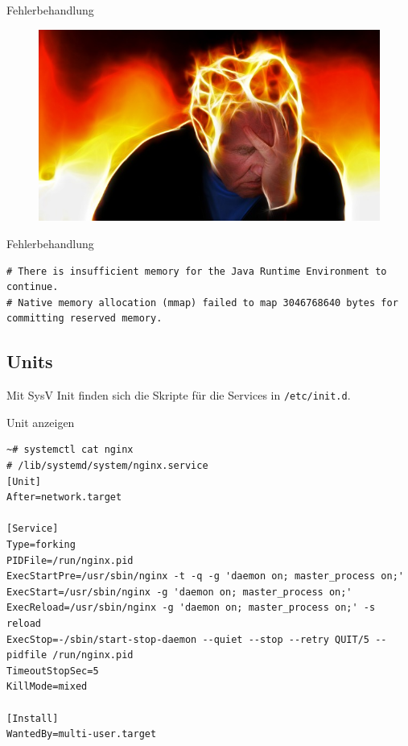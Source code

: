 \begin{frame}{Fehlerbehandlung}
  \begin{figure}[!ht]
     \centering
     \includegraphics[width=0.9\linewidth]{img/stress.jpg}
  \end{figure}
\end{frame}

\begin{frame}[fragile]{Fehlerbehandlung}
\begin{lstlisting}
# There is insufficient memory for the Java Runtime Environment to continue.
# Native memory allocation (mmap) failed to map 3046768640 bytes for committing reserved memory.
\end{lstlisting}
\end{frame}

\subsection{Units}

Mit SysV Init finden sich die Skripte für die Services in \verb|/etc/init.d|.

\begin{frame}[fragile]{Unit anzeigen}
\begin{lstlisting}
~# systemctl cat nginx
# /lib/systemd/system/nginx.service
[Unit]
After=network.target

[Service]
Type=forking
PIDFile=/run/nginx.pid
ExecStartPre=/usr/sbin/nginx -t -q -g 'daemon on; master_process on;'
ExecStart=/usr/sbin/nginx -g 'daemon on; master_process on;'
ExecReload=/usr/sbin/nginx -g 'daemon on; master_process on;' -s reload
ExecStop=-/sbin/start-stop-daemon --quiet --stop --retry QUIT/5 --pidfile /run/nginx.pid
TimeoutStopSec=5
KillMode=mixed

[Install]
WantedBy=multi-user.target
\end{lstlisting}
\end{frame}


